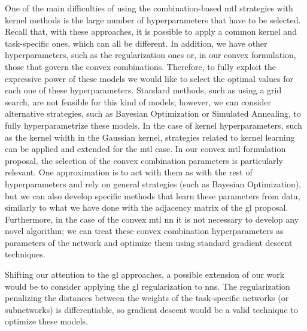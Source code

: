 One of the main difficulties of using the combination-based \acrshort{mtl} strategies with kernel methods is the large number of hyperparameters that have to be selected. Recall that, with these approaches, it is possible to apply a common kernel and task-specific ones, which can all be different. In addition, we have other hyperparameters, such as the regularization ones or, in our convex formulation, those that govern the convex combinations. 
%
Therefore, to fully exploit the expressive power of these models we would like to select the optimal values for each one of these hyperparameters. Standard methods, such as using a grid search, are not feasible for this kind of models; however, we can consider alternative strategies, such as Bayesian Optimization or Simulated Annealing, to fully hyperparametrize these models.
In the case of kernel hyperparameters, such as the kernel width in the Gaussian kernel, strategies related to kernel learning can be applied and extended for the \acrshort{mtl} case. 
In our convex \acrshort{mtl} formulation proposal, the selection of the convex combination parameters is particularly relevant. One approximation is to act with them as with the rest of hyperparameters and rely on general strategies (such as Bayesian Optimization), but we can also develop specific methods that learn these parameters from data, similarly to what we have done with the adjacency matrix of the \acrshort{gl} proposal.
Furthermore, in the case of the convex \acrshort{mtl} \acrshort{nn} it is not necessary to develop any novel algorithm; we can treat these convex combination hyperparameters as parameters of the network and optimize them using standard gradient descent techniques.

Shifting our attention to the \acrshort{gl} approaches, a possible extension of our work would be to consider applying the \acrshort{gl} regularization to \acrshort{nns}.
The regularization penalizing the distances between the weights of the task-specific networks (or subnetworks) is differentiable, so gradient descent would be a valid technique to optimize these models.



